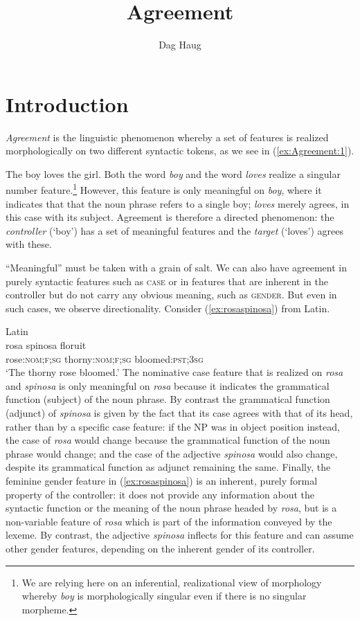 \documentclass[output=paper,hidelinks]{langscibook}
\title{Agreement}
\author{Dag Haug\affiliation{University of Oslo}}
\begin{document}
\maketitle
\label{chap:Agreement}

\section{Introduction}

\emph{Agreement} is the linguistic phenomenon whereby a set of features
is realized morphologically on two different syntactic tokens, as we see in (\ref{ex:Agreement:1}).

\ea\label{ex:Agreement:1} The boy loves the girl.  \z Both the word \textit{boy} and the
word \textit{loves} realize a singular number feature.\footnote{We are
relying here on an inferential, realizational view of morphology
whereby \textit{boy} is morphologically singular even if there is no
singular morpheme.} However, this feature is only meaningful on
\textit{boy}, where it indicates that that the noun phrase refers to a
single boy; \textit{loves} merely agrees, in this case with its
subject. Agreement is therefore a directed phenomenon: the
\textit{controller} (`boy') has a set of meaningful features and the
\textit{target} (`loves') agrees with these.

``Meaningful'' must be taken with a grain of salt. We can also have
agreement in purely syntactic features such as \textsc{case} or in
features that are inherent in the controller but do not carry any
obvious meaning, such as \textsc{gender}. But even in such cases, we
observe directionality. Consider (\ref{ex:rosaspinosa}) from Latin.

\ea\label{ex:rosaspinosa} Latin\\
\gll rosa spinosa floruit\\
rose:\textsc{nom;f;sg} thorny:\textsc{nom;f;sg} bloomed:\textsc{pst;3sg}\\
\glt `The thorny rose bloomed.'
\z
%
The nominative case feature that is realized on \textit{rosa} and
\textit{spinosa} is only meaningful on \textit{rosa} because it
indicates the grammatical function (subject) of the noun phrase. By
contrast the grammatical function (adjunct) of \textit{spinosa} is
given by the fact that its case agrees with that of its head, rather
than by a specific case feature: if the NP was in object position
instead, the case of \textit{rosa} would change because the
grammatical function of the noun phrase would change; and the case of
the adjective \textit{spinosa} would also change, despite its
grammatical function as adjunct remaining the same. Finally, the
feminine gender feature in (\ref{ex:rosaspinosa}) is an inherent, purely formal
property of the controller: it does not provide any information about
the syntactic function or the meaning of the noun phrase headed by
\textit{rosa}, but is a non-variable feature of \textit{rosa} which is
part of the information conveyed by the lexeme. By contrast, the
adjective \textit{spinosa} inflects for this feature and can assume
other gender features, depending on the inherent gender of its
controller.
\end{document}
